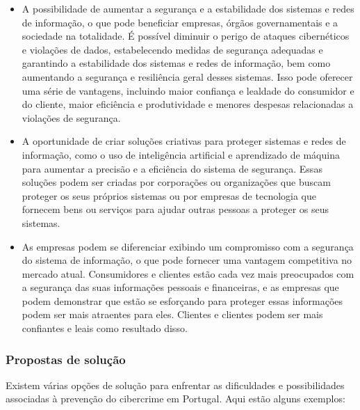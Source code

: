 \begin{itemize}
  \item A possibilidade de aumentar a segurança e a estabilidade dos sistemas e redes de informação, o que pode beneficiar empresas, órgãos governamentais e a sociedade na totalidade. É possível diminuir o perigo de ataques cibernéticos e violações de dados, estabelecendo medidas de segurança adequadas e garantindo a estabilidade dos sistemas e redes de informação, bem como aumentando a segurança e resiliência geral desses sistemas. Isso pode oferecer uma série de vantagens, incluindo maior confiança e lealdade do consumidor e do cliente, maior eficiência e produtividade e menores despesas relacionadas a violações de segurança.
  \item A oportunidade de criar soluções criativas para proteger sistemas e redes de informação, como o uso de inteligência artificial e aprendizado de máquina para aumentar a precisão e a eficiência do sistema de segurança. Essas soluções podem ser criadas por corporações ou organizações que buscam proteger os seus próprios sistemas ou por empresas de tecnologia que fornecem bens ou serviços para ajudar outras pessoas a proteger os seus sistemas.
  \item As empresas podem se diferenciar exibindo um compromisso com a segurança do sistema de informação, o que pode fornecer uma vantagem competitiva no mercado atual. Consumidores e clientes estão cada vez mais preocupados com a segurança das suas informações pessoais e financeiras, e as empresas que podem demonstrar que estão se esforçando para proteger essas informações podem ser mais atraentes para eles. Clientes e clientes podem ser mais confiantes e leais como resultado disso.
\end{itemize}

\subsubsection{Propostas de solução}

Existem várias opções de solução para enfrentar as dificuldades e possibilidades associadas à prevenção do cibercrime em Portugal. Aqui estão alguns exemplos:

